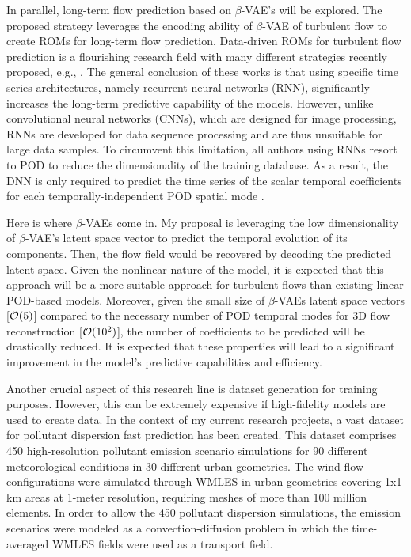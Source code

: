 \documentclass{article}
\begin{document}
In parallel, long-term flow prediction based on $\beta$-VAE's will be explored. The proposed strategy leverages the encoding ability of $\beta$-VAE of turbulent flow to create ROMs for long-term flow prediction. Data-driven ROMs for turbulent flow prediction is a flourishing research field with many different strategies recently proposed, e.g., \cite{LEE21,LOP21,ABA22}. The general conclusion of these works is that using specific time series architectures, namely recurrent neural networks (RNN), significantly increases the long-term predictive capability of the models. However, unlike convolutional neural networks (CNNs), which are designed for image processing, RNNs are developed for data sequence processing and are thus unsuitable for large data samples. To circumvent this limitation, all authors using RNNs resort to POD to reduce the dimensionality of the training database. As a result, the DNN is only required to predict the time series of the scalar temporal coefficients for each temporally-independent POD spatial mode \cite{ABA22}.

Here is where $\beta$-VAEs come in. My proposal is leveraging the low dimensionality of $\beta$-VAE's latent space vector to predict the temporal evolution of its components. Then,  the flow field would be recovered by decoding the predicted latent space. Given the nonlinear nature of the model, it is expected that this approach will be a more suitable approach for turbulent flows than existing linear POD-based models. Moreover, given the small size of $\beta$-VAEs latent space vectors [${\cal O}(5)$] compared to the necessary number of POD temporal modes for 3D flow reconstruction [${\cal O}(10^2)$], the number of coefficients to be predicted will be drastically reduced. It is expected that these properties will lead to a significant improvement in the model's predictive capabilities and efficiency.

Another crucial aspect of this research line is dataset generation for training purposes. However, this can be extremely expensive if high-fidelity models are used to create data. In the context of my current research projects, a vast dataset for pollutant dispersion fast prediction has been created. This dataset comprises 450 high-resolution pollutant emission scenario simulations for 90 different meteorological conditions in 30 different urban geometries. The wind flow configurations were simulated through WMLES in urban geometries covering 1x1 km areas at 1-meter resolution, requiring meshes of more than 100 million elements. In order to allow the 450 pollutant dispersion simulations, the emission scenarios were modeled as a convection-diffusion problem in which the time-averaged WMLES fields were used as a transport field. 
\end{document}
